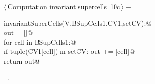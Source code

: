 \documentclass[11pt,oneside]{article}	%
\begin{document}
\begin{flushleft} \small \label{scrap18}
\protect{}$\langle\,$Computation invariant supercells\nobreak\ {\footnotesize 10c}$\,\rangle\equiv$
\vspace{-1ex}
\begin{list}{}{} \item
\mbox{}\verb@def invariantSuperCells(V,BSupCells1,CV1,setCV):@\\
\mbox{}\verb@   out = []@\\
\mbox{}\verb@   for cell in BSupCells1:@\\
\mbox{}\verb@      if tuple(CV1[cell]) in setCV: out += [cell]@\\
\mbox{}\verb@   return out@\\
\mbox{}\verb@@{\NWsep}
\end{list}
\vspace{-1ex}
\footnotesize\addtolength{\baselineskip}{-1ex}
\begin{list}{}{\setlength{\itemsep}{-\parsep}\setlength{\itemindent}{-\leftmargin}}
\item \NWtxtMacroRefIn\ .
\end{list}
\end{flushleft}
\end{document}
